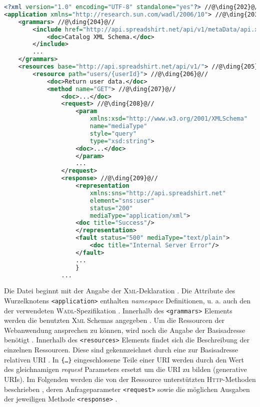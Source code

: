 \begin{minipage}{\textwidth}
\begin{lstlisting}[language=XML, caption={Beispielaufbau einer \textsc{Wadl}-Datei anhand der Spreadshirt-\textsc{Api} Beschreibung}, label=lst:wadlstructure, name=wadlstructure]
<?xml version="1.0" encoding="UTF-8" standalone="yes"?> //@\ding{202}@//
<application xmlns="http://research.sun.com/wadl/2006/10"> //@\ding{203}@//
    <grammars> //@\ding{204}@//
        <include href="http://api.spreadshirt.net/api/v1/metaData/api.xsd">
            <doc>Catalog XML Schema.</doc>
        </include>
        ...
    </grammars>
    <resources base="http://api.spreadshirt.net/api/v1/"> //@\ding{205}@//
        <resource path="users/{userId}"> //@\ding{206}@//
            <doc>Return user data.</doc>
            <method name="GET"> //@\ding{207}@//
                <doc>...</doc>
                <request> //@\ding{208}@//
                    <param 
                        xmlns:xsd="http://www.w3.org/2001/XMLSchema" 
                        name="mediaType" 
                        style="query" 
                        type="xsd:string">
                    <doc>...</doc>
                    </param>
                    ...
                </request>
                <response> //@\ding{209}@//
                    <representation 
                        xmlns:sns="http://api.spreadshirt.net"
                        element="sns:user" 
                        status="200" 
                        mediaType="application/xml">
                    <doc title="Success"/>
                    </representation>
                    <fault status="500" mediaType="text/plain">
                        <doc title="Internal Server Error"/>
                    </fault>
                    ...
                    }
                ...
\end{lstlisting}
\end{minipage}

Die Datei beginnt mit der Angabe der \textsc{Xml}-Deklaration .
Die Attribute des Wurzelknotens \texttt{<application>} enthalten \emph{namespace} Definitionen, u. a. auch den der verwendeten \textsc{Wadl}-Spezifikation .
Innerhalb des \texttt{<grammars>} Elements werden die benutzten \textsc{Xml} Schemas angegeben . 
Um die Ressourcen der Webanwendung ansprechen zu können, wird noch die Angabe der Basisadresse benötigt . 
Innerhalb des \texttt{<resources>} Elements findet sich die Beschreibung der einzelnen Ressourcen. Diese sind gekennzeichnet durch eine zur Basisadresse relativen \gls{URI} . In \texttt{\{\ldots\}} eingeschlossene Teile einer \gls{URI} werden durch den Wert des gleichnamigen \emph{request} Parameters ersetzt um die \gls{URI} zu bilden (generative \glspl{URI}).
Im Folgenden werden die von der Ressource unterstützten \textsc{Http}-Methoden beschrieben , deren Anfrageparameter \texttt{<request>}  sowie die möglichen Ausgaben der jeweiligen Methode \texttt{<response>} .

